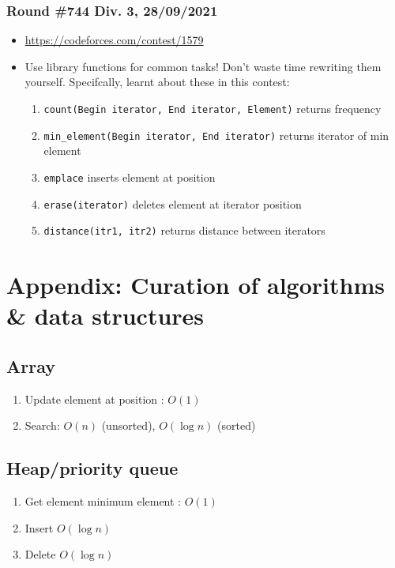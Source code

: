 \documentclass[titlepage, 12pt]{book}
\begin{document}
\subsection{Round \#744 Div. 3, 28/09/2021}
\begin{itemize}
  \item \url{https://codeforces.com/contest/1579}
  \item Use library functions for common tasks! Don't waste time rewriting them
    yourself. Specifcally, learnt about these in this contest:
    \begin{enumerate}
      \item \verb|count(Begin iterator, End iterator, Element)| returns
        frequency
      \item \verb|min_element(Begin iterator, End iterator)| returns iterator of
        min element
      \item \verb|emplace| inserts element at position
      \item \verb|erase(iterator)| deletes element at iterator position
      \item \verb|distance(itr1, itr2)| returns distance between iterators
    \end{enumerate}
\end{itemize}
\chapter{Appendix: Curation of algorithms \& data structures}
\section{Array}
\begin{enumerate}
    \item Update element at position : $O(1)$
    \item Search: $O(n)$ (unsorted), $O(\log n)$ (sorted)
\end{enumerate}

\section{Heap/priority queue}
\begin{enumerate}
    \item Get element minimum element : $O(1)$
    \item Insert $O(\log n)$
    \item Delete $O(\log n)$
\end{enumerate}
\end{document}
